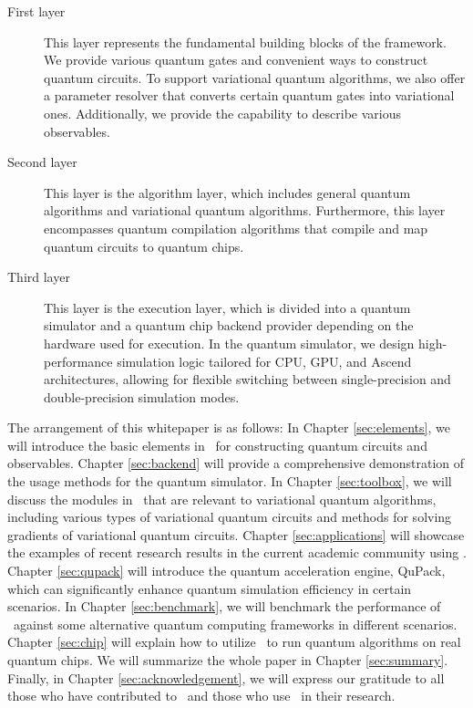 \begin{description}
    \item[First layer] This layer represents the fundamental building blocks of the framework. We provide various quantum gates and convenient ways to construct quantum circuits. To support variational quantum algorithms, we also offer a parameter resolver that converts certain quantum gates into variational ones. Additionally, we provide the capability to describe various observables.
    \item[Second layer] This layer is the algorithm layer, which includes general quantum algorithms and variational quantum algorithms. Furthermore, this layer encompasses quantum compilation algorithms that compile and map quantum circuits to quantum chips.
    \item[Third layer] This layer is the execution layer, which is divided into a quantum simulator and a quantum chip backend provider depending on the hardware used for execution. In the quantum simulator, we design high-performance simulation logic tailored for CPU, GPU, and Ascend architectures, allowing for flexible switching between single-precision and double-precision simulation modes.
\end{description}

The arrangement of this whitepaper is as follows: In Chapter \hyperref[sec:elements]{\ref*{sec:elements}}, we will introduce the basic elements in \MindQuantum\ for constructing quantum circuits and observables. Chapter \hyperref[sec:backend]{\ref*{sec:backend}} will provide a comprehensive demonstration of the usage methods for the quantum simulator. In Chapter \hyperref[sec:toolbox]{\ref*{sec:toolbox}}, we will discuss the modules in \MindQuantum\ that are relevant to variational quantum algorithms, including various types of variational quantum circuits and methods for solving gradients of variational quantum circuits. Chapter \hyperref[sec:applications]{\ref*{sec:applications}} will showcase the examples of recent research results in the current academic community using \MindQuantum. Chapter \hyperref[sec:qupack]{\ref*{sec:qupack}} will introduce the quantum acceleration engine, QuPack, which can significantly enhance quantum simulation efficiency in certain scenarios. In Chapter \hyperref[sec:benchmark]{\ref*{sec:benchmark}}, we will benchmark the performance of \MindQuantum\ against some alternative quantum computing frameworks in different scenarios. Chapter \hyperref[sec:chip]{\ref*{sec:chip}} will explain how to utilize \MindQuantum\ to run quantum algorithms on real quantum chips. We will summarize the whole paper in Chapter \hyperref[sec:summary]{\ref*{sec:summary}}. Finally, in Chapter \hyperref[sec:acknowledgement]{\ref*{sec:acknowledgement}}, we will express our gratitude to all those who have contributed to \MindQuantum\ and those who use \MindQuantum\ in their research.
